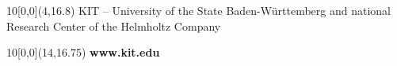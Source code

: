 \begin{titlepage}
\vspace{2cm}


\begin{textblock}{10}[0,0](4,16.8)
\tiny{ 
		{KIT -- University of the State Baden-Württemberg and national Research Center of the Helmholtz Company}
}
\end{textblock}

\begin{textblock}{10}[0,0](14,16.75)
\large{
	\textbf{www.kit.edu} 
}
\end{textblock}

\end{titlepage}
